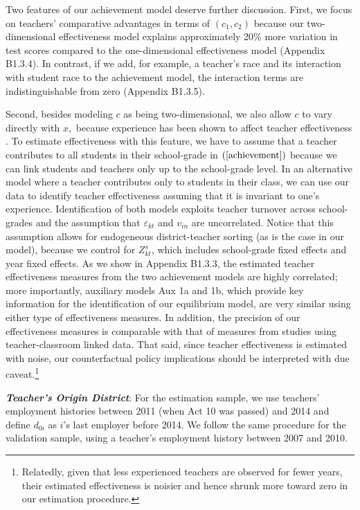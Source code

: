 \documentclass[notitlepage,12pt]{article}%
\begin{document}
Two features of our achievement model deserve further discussion. First, we
focus on teachers' comparative advantages in terms of $\left(  c_{1}%
,c_{2}\right)  $ because our two-dimensional effectiveness model explains
approximately 20\% more variation in test scores compared to the
one-dimensional effectiveness model (Appendix B1.3.4). In contrast, if
we add, for example, a teacher's race and its interaction with student race to
the achievement model, the interaction terms are indistinguishable from zero
(Appendix B1.3.5).

Second, besides modeling $c$ as being two-dimensional, we also allow $c$ to
vary directly with $x,$ because experience has been shown to affect teacher
effectiveness \citep[e.g.,][]{rockoff2004impact,wiswall2013dynamics}. To
estimate effectiveness with this feature, we have to assume that a teacher
contributes to all students in their school-grade in $\left(
\ref{achievement}\right)  $ because we can link students and teachers only up
to the school-grade level. In an alternative model where a teacher contributes
only to students in their class, we can use our data to identify teacher
effectiveness assuming that it is invariant to one's experience.
Identification of both models exploits teacher turnover across school-grades
and the assumption that $\varepsilon_{kt}$ and $v_{in}$ are uncorrelated.
Notice that this assumption allows for endogeneous district-teacher sorting
(as is the case in our model), because we control for $Z_{kt}^{s}$, which
includes school-grade fixed effects and year fixed effects. As we show in
Appendix B1.3.3, the estimated teacher effectiveness measures from the
two achievement models are highly correlated; more importantly, auxiliary
models Aux 1a and 1b, which provide key information for the identification of
our equilibrium model, are very similar using either type of effectiveness
measures. In addition, the precision of our effectiveness measures is
comparable with that of measures from studies using teacher-classroom linked
data. That said, since teacher effectiveness is estimated with noise,
our counterfactual policy implications should be interpreted with due caveat.\footnote{Relatedly, given that less experienced teachers are observed for fewer years, their estimated effectiveness is noisier and hence shrunk more toward zero in our estimation procedure.} 

\medskip\noindent\textit{\textbf{Teacher's Origin District}}: For the
estimation sample, we use teachers' employment histories between 2011 (when
Act 10 was passed) and 2014 and define $d_{0i}$ as $i$'s last employer before
2014. We follow the same procedure for the validation sample, using a
teacher's employment history between 2007 and 2010.
\end{document}
